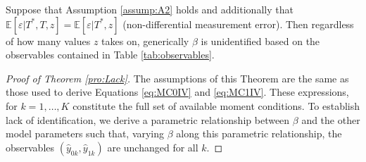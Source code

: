 \begin{thm}
  \label{pro:Lack}
  Suppose that Assumption \ref{assump:A2} holds and additionally that $\mathbb{E}[\varepsilon|T^*,T,z]=\mathbb{E}[\varepsilon|T^*,z]$ (non-differential measurement error).  
  Then regardless of how many values $z$ takes on, generically $\beta$ is unidentified based on the observables contained in Table \ref{tab:observables}.
\end{thm}
\begin{proof}[Proof of Theorem \ref{pro:Lack}]
  The assumptions of this Theorem are the same as those used to derive Equations \ref{eq:MC0IV} and \ref{eq:MC1IV}. 
  These expressions, for $k = 1, \dots, K$ constitute the full set of available moment conditions.
  To establish lack of identification, we derive a parametric relationship between $\beta$ and the other model parameters such that, varying $\beta$ along this parametric relationship, the observables $(\hat{y}_{0k},\hat{y}_{1k})$ are unchanged for all $k$.   


\end{proof}
